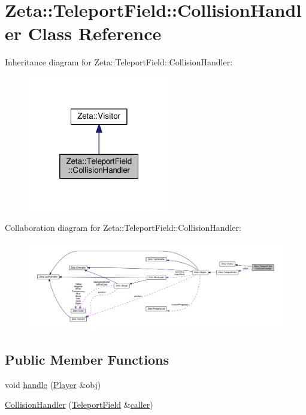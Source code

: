 \hypertarget{classZeta_1_1TeleportField_1_1CollisionHandler}{\section{Zeta\+:\+:Teleport\+Field\+:\+:Collision\+Handler Class Reference}
\label{classZeta_1_1TeleportField_1_1CollisionHandler}
}


Inheritance diagram for Zeta\+:\+:Teleport\+Field\+:\+:Collision\+Handler\+:\nopagebreak
\begin{figure}[H]
\begin{center}
\leavevmode
\includegraphics[width=176pt]{classZeta_1_1TeleportField_1_1CollisionHandler__inherit__graph}
\end{center}
\end{figure}


Collaboration diagram for Zeta\+:\+:Teleport\+Field\+:\+:Collision\+Handler\+:\nopagebreak
\begin{figure}[H]
\begin{center}
\leavevmode
\includegraphics[width=350pt]{classZeta_1_1TeleportField_1_1CollisionHandler__coll__graph}
\end{center}
\end{figure}
\subsection*{Public Member Functions}
\begin{DoxyCompactItemize}
\item 
void \hyperlink{classZeta_1_1TeleportField_1_1CollisionHandler_a884373a9db9df004f2d0d7b3e3fd4458}{handle} (\hyperlink{classZeta_1_1Player}{Player} \&obj)
\item 
\hyperlink{classZeta_1_1TeleportField_1_1CollisionHandler_a7d6176efdfdc13f925af82ccb56d770c}{Collision\+Handler} (\hyperlink{classZeta_1_1TeleportField}{Teleport\+Field} \&\hyperlink{classZeta_1_1TeleportField_1_1CollisionHandler_a77c025b99e8a0c447cabc24896ed1b6d}{caller})
\end{DoxyCompactItemize}

